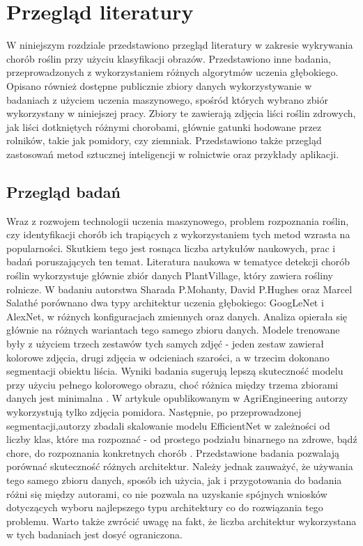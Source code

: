 \section{Przegląd literatury}
\label{sec:przeglad}
W niniejszym rozdziale przedstawiono przegląd literatury w zakresie wykrywania chorób roślin przy użyciu klasyfikacji obrazów. Przedstawiono  inne badania, przeprowadzonych z wykorzystaniem różnych algorytmów uczenia głębokiego. Opisano również dostępne publicznie zbiory danych wykorzystywanie w badaniach z użyciem uczenia maszynowego, spośród których wybrano zbiór wykorzystany w niniejszej pracy. Zbiory te zawierają  zdjęcia liści roślin zdrowych, jak liści dotkniętych różnymi chorobami, głównie gatunki hodowane przez rolników, takie jak pomidory, czy ziemniak. Przedstawiono także przegląd zastosowań metod sztucznej inteligencji  w rolnictwie oraz przykłady aplikacji.
\subsection{Przegląd badań}
Wraz z rozwojem technologii uczenia maszynowego, problem rozpoznania roślin, czy identyfikacji chorób ich trapiących z wykorzystaniem tych metod wzrasta na popularności. Skutkiem tego jest rosnąca liczba artykułów naukowych, prac i badań poruszających ten temat. Literatura naukowa w tematyce detekcji chorób roślin wykorzystuje głównie zbiór danych PlantVillage, który zawiera rośliny rolnicze. W badaniu autorstwa Sharada P.Mohanty, David P.Hughes oraz Marcel Salathé porównano dwa typy architektur uczenia głębokiego: GoogLeNet i AlexNet, w różnych konfiguracjach zmiennych oraz danych. Analiza opierała się głównie na różnych wariantach tego samego zbioru danych. Modele trenowane były z użyciem trzech zestawów tych samych zdjęć - jeden zestaw zawierał kolorowe zdjęcia, drugi zdjęcia w odcieniach szarości, a w trzecim dokonano segmentacji obiektu liścia. Wyniki badania sugerują lepszą skuteczność modelu przy użyciu pełnego kolorowego obrazu, choć różnica między trzema zbiorami danych jest minimalna \cite{sharada}. \newline W artykule opublikowanym w AgriEngineering autorzy wykorzystują tylko zdjęcia pomidora. Następnie, po przeprowadzonej segmentacji,autorzy zbadali skalowanie modelu EfficientNet w zależności od liczby klas, które ma rozpoznać - od prostego podziału binarnego na zdrowe, bądź chore, do rozpoznania konkretnych chorób \cite{tomato}. Przedstawione  badania pozwalają porównać skuteczność różnych architektur. Należy jednak zauważyć, że  używania tego samego zbioru danych, sposób ich użycia, jak i przygotowania do badania różni się między autorami, co nie pozwala na uzyskanie spójnych wniosków dotyczących wyboru najlepszego typu architektury co do rozwiązania tego problemu. Warto także zwrócić uwagę na fakt, że liczba architektur wykorzystana w tych badaniach jest dosyć ograniczona.
